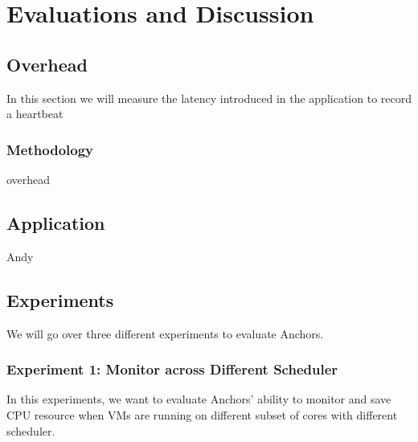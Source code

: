 \section{Evaluations and Discussion}




\subsection{Overhead}




In this section we will measure the latency introduced in the application to record a heartbeat

\subsubsection*{Methodology}



overhead

\subsection{Application}

Andy

\subsection{Experiments}

We will go over three different experiments to evaluate Anchors.

\subsubsection{Experiment 1: Monitor across Different Scheduler}
\hfill \linebreak
In this experiments, we want to evaluate Anchors' ability to monitor and save CPU resource when VMs are running on different subset of cores with different scheduler.

